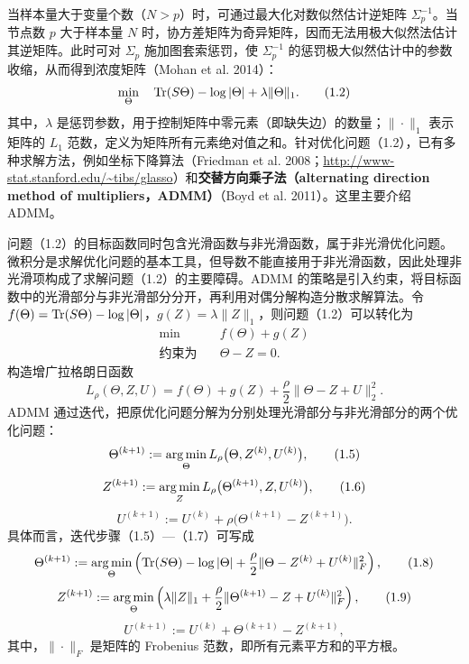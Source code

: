 当样本量大于变量个数（$N>p$）时，可通过最大化对数似然估计逆矩阵 $\Sigma_p^{-1}$。当节点数 $p$ 大于样本量 $N$ 时，协方差矩阵为奇异矩阵，因而无法用极大似然法估计其逆矩阵。此时可对 $\Sigma_p$ 施加图套索惩罚，使 $\Sigma_p^{-1}$ 的惩罚极大似然估计中的参数收缩，从而得到浓度矩阵（Mohan et al. 2014）：
\begin{equation}
\min_{\Theta}\quad \operatorname{Tr}(S\Theta)-\log|\Theta|+\lambda\|\Theta\|_1.
\tag{1.2}
\end{equation}
其中，$\lambda$ 是惩罚参数，用于控制矩阵中零元素（即缺失边）的数量；$\|\cdot\|_1$ 表示矩阵的 $L_1$ 范数，定义为矩阵所有元素绝对值之和。针对优化问题（1.2），已有多种求解方法，例如坐标下降算法（Friedman et al. 2008；\url{http://www-stat.stanford.edu/~tibs/glasso}）和\textbf{交替方向乘子法（alternating direction method of multipliers，ADMM）}（Boyd et al. 2011）。这里主要介绍 ADMM。

问题（1.2）的目标函数同时包含光滑函数与非光滑函数，属于非光滑优化问题。微积分是求解优化问题的基本工具，但导数不能直接用于非光滑函数，因此处理非光滑项构成了求解问题（1.2）的主要障碍。ADMM 的策略是引入约束，将目标函数中的光滑部分与非光滑部分分开，再利用对偶分解构造分散求解算法。令 $f(\Theta)=\operatorname{Tr}(S\Theta)-\log|\Theta|$，$g(Z)=\lambda\|Z\|_1$，则问题（1.2）可以转化为
\begin{equation}
\begin{aligned}
\min\quad&f(\Theta)+g(Z)\\
\text{约束为}\quad&\Theta-Z=0.
\end{aligned}\tag{1.3}
\end{equation}
构造增广拉格朗日函数
\begin{equation}
L_\rho(\Theta,Z,U)=f(\Theta)+g(Z)+\frac\rho2\|\Theta-Z+U\|_2^2.
\tag{1.4}
\end{equation}
ADMM 通过迭代，把原优化问题分解为分别处理光滑部分与非光滑部分的两个优化问题：
\begin{equation}
\Theta^{(k+1)}:=\operatorname*{arg\,min}_{\Theta}L_\rho\bigl(\Theta,Z^{(k)},U^{(k)}\bigr),
\tag{1.5}
\end{equation}
\begin{equation}
Z^{(k+1)}:=\operatorname*{arg\,min}_ZL_\rho\bigl(\Theta^{(k+1)},Z,U^{(k)}\bigr),
\tag{1.6}
\end{equation}
\begin{equation}
U^{(k+1)}:=U^{(k)}+\rho\bigl(\Theta^{(k+1)}-Z^{(k+1)}\bigr).
\tag{1.7}
\end{equation}
具体而言，迭代步骤（1.5）—（1.7）可写成
\begin{equation}
\Theta^{(k+1)}:=\operatorname*{arg\,min}_{\Theta}\left(\operatorname{Tr}(S\Theta)-\log|\Theta|
+\frac\rho2\|\Theta-Z^{(k)}+U^{(k)}\|_F^2\right),
\tag{1.8}
\end{equation}
\begin{equation}
Z^{(k+1)}:=\operatorname*{arg\,min}_{\Theta}\left(\lambda\|Z\|_1
+\frac\rho2\|\Theta^{(k+1)}-Z+U^{(k)}\|_F^2\right),
\tag{1.9}
\end{equation}
\begin{equation}
U^{(k+1)}:=U^{(k)}+\Theta^{(k+1)}-Z^{(k+1)},
\tag{1.10}
\end{equation}
其中，$\|\cdot\|_F$ 是矩阵的 Frobenius 范数，即所有元素平方和的平方根。

